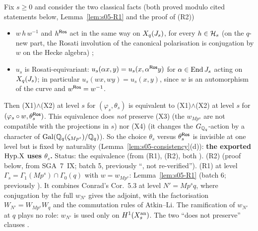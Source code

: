 \begin{proposition}\label{prop:s05-AL}
Fix $s\ge0$ and consider the two classical facts (both proved modulo cited statements below, Lemma~\ref{lem:s05-R1} and the proof of (R2))
\begin{itemize}
\item[(R1)] $w\,h\,w^{-1}$ and $h^{\mathsf{Ros}}$ act in the same way on $X_q(J_s)$, for every $h\in\mathcal{H}_s$ (on the $q$-new part, the Rosati involution of
  the canonical polarisation is conjugation by $w$ on the Hecke algebra)
  ;
\item[(R2)] $u_s$ is Rosati-equivariant: $u_s(\alpha x,y)=u_s(x,\alpha^{\mathsf{Ros}} y)$ for $\alpha\in\operatorname{End} J_s$ acting on $X_q(J_s)$; in particular
  $u_s(wx,wy)=u_s(x,y)$, since $w$ is an automorphism of the curve and $w^{\mathsf{Ros}}=w^{-1}$.
\end{itemize}
Then (X1)$\wedge$(X2) at level $s$ for $(\varphi_s,\theta_s)$ is equivalent to (X1)$\wedge$(X2) at level $s$ for
$(\varphi_s\circ w,\theta^{\mathsf{Ros}}_s)$. This equivalence does \emph{not} preserve (X3) (the $w_{Mp^s}$ are not compatible with the projections in $s$)
nor (X4) (it changes the $G_{\mathbb{Q}_q}$-action by a character of $\mathrm{Gal}(\mathbb{Q}_q(\zeta_{Mp^s})/\mathbb{Q}_q)$). So the choice $\theta_s$ versus
$\theta^{\mathsf{Ros}}_s$ is invisible at one level but is fixed by naturality (Lemma~\ref{lem:s05-consistency}(d)): \textbf{the exported $\mathrm{Hyp.X}$
uses $\theta_s$.}
Status: the equivalence \stpmc{} (from (R1), (R2), both \stpmc). (R2) \stpmc{} (proof below, from SGA~7~IX; batch 5, previously ``\stcited, not
re-verified''). (R1) \stpmc{} at level $\Gamma_s=\Gamma_1(Mp^s)\cap\Gamma_0(q)$ with $w=w_{Mp^s}$: Lemma~\ref{lem:s05-R1} (batch 6; previously \stexp).
It combines Conrad's Cor.~5.3 at level $N'=Mp^sq$, where conjugation by the full $w_{N'}$ gives the adjoint, with the factorisation
$W_{N'}=W_{Mp^s}W_q$ and the commutation rules of Atkin--Li. The ramification of $w_{N'}$ at $q$ plays no role: $w_{N'}$ is used only on $H^1(X_s^{\rm an})$.
The two ``does not preserve'' clauses \stsketch.
\end{proposition}
